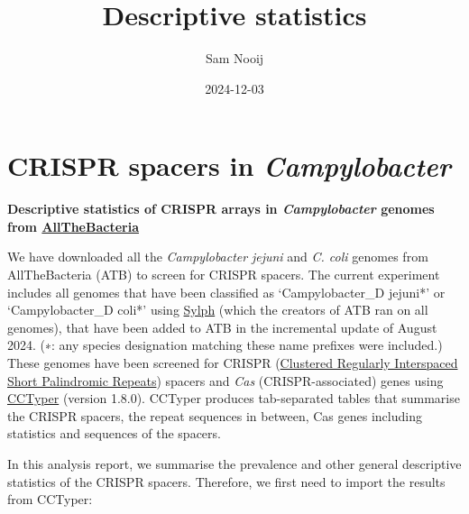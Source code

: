 \documentclass[
  twocolumn,
  landscape]{report}
\title{Descriptive statistics}
\author{Sam Nooij}
\date{2024-12-03}
\renewcommand*\contentsname{Table of contents}
\newcommand\contentsname{Table of contents}
\begin{document}
\maketitle

\renewcommand*\contentsname{Table of contents}
{
\hypersetup{linkcolor=}
\setcounter{tocdepth}{2}
\tableofcontents
}

\chapter{\texorpdfstring{CRISPR spacers in
\emph{Campylobacter}}{CRISPR spacers in Campylobacter}}\label{crispr-spacers-in-campylobacter}

\textbf{Descriptive statistics of CRISPR arrays in \emph{Campylobacter}
genomes from
\href{https://allthebacteria.readthedocs.io/}{AllTheBacteria}}

We have downloaded all the \emph{Campylobacter} \emph{jejuni} and
\emph{C. coli} genomes from AllTheBacteria (ATB) to screen for CRISPR
spacers. The current experiment includes all genomes that have been
classified as `Campylobacter\_D jejuni*' or `Campylobacter\_D coli*'
using \href{https://www.nature.com/articles/s41587-024-02412-y}{Sylph}
(which the creators of ATB ran on all genomes), that have been added to
ATB in the incremental update of August 2024. (∗: any species
designation matching these name prefixes were included.) These genomes
have been screened for CRISPR
(\href{https://en.wikipedia.org/wiki/CRISPR}{Clustered Regularly
Interspaced Short Palindromic Repeats}) spacers and \emph{Cas}
(CRISPR-associated) genes using
\href{https://www.biorxiv.org/content/10.1101/2020.05.15.097824v1}{CCTyper}
(version 1.8.0). CCTyper produces tab-separated tables that summarise
the CRISPR spacers, the repeat sequences in between, Cas genes including
statistics and sequences of the spacers.

In this analysis report, we summarise the prevalence and other general
descriptive statistics of the CRISPR spacers. Therefore, we first need
to import the results from CCTyper:
\end{document}
